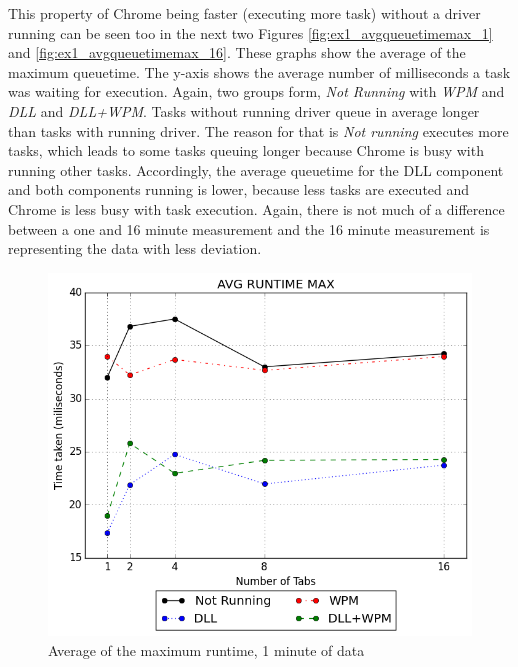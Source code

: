 This property of Chrome being faster (executing more task) without a driver running can be seen too in the next two Figures \ref{fig:ex1_avgqueuetimemax_1} and \ref{fig:ex1_avgqueuetimemax_16}. These graphs show the average of the maximum queuetime. The y-axis shows the average number of milliseconds a task was waiting for execution. Again, two groups form, \emph{Not Running} with \emph{\gls{WPM}} and \emph{\gls{DLL}} and \emph{\gls{DLL}+\gls{WPM}}. Tasks without running driver queue in average longer than tasks with running driver. The reason for that is \emph{Not running} executes more tasks, which leads to some tasks queuing longer because Chrome is busy with running other tasks. Accordingly, the average queuetime for the \gls{DLL} component and both components running is lower, because less tasks are executed and Chrome is less busy with task execution. Again, there is not much of a difference between a one and 16 minute measurement and the 16 minute measurement is representing the data with less deviation.
\begin{figure}[!htbp]
	\centering
    \includegraphics[width=\textwidth,keepaspectratio]{Evaluation/experiment1/AVG-RUNTIME-MAX-1.png}
    \caption{Average of the maximum runtime, 1 minute of data}
    \label{fig:ex1_avgruntimemax_1}
\end{figure}
